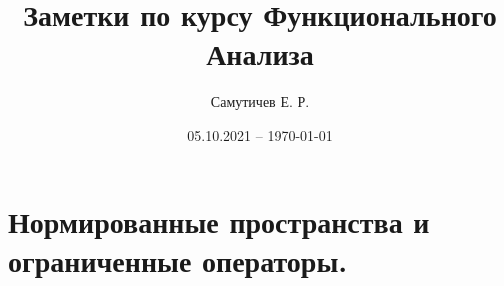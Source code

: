 \documentclass[12pt,a4paper]{article}
\title{Заметки по курсу Функционального Анализа}
\author{Самутичев Е. Р.}
\date{05.10.2021 -- \today{}}
\theoremstyle{definition}
\begin{document}
\maketitle

\section{Нормированные пространства и ограниченные операторы.}


\end{document}
